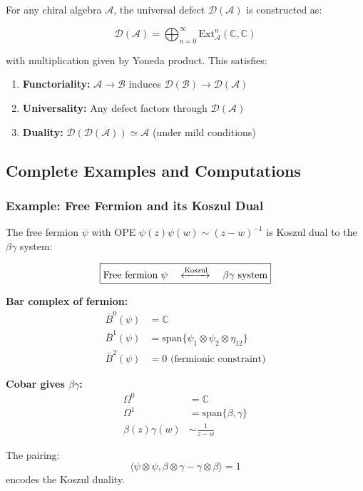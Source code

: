 \begin{theorem}\label{thm:universal-defect-construction}
For any chiral algebra $\mathcal{A}$, the universal defect $\mathcal{D}(\mathcal{A})$ is constructed as:

$$\mathcal{D}(\mathcal{A}) = \bigoplus_{n=0}^\infty \text{Ext}^n_{\mathcal{A}}(\mathbb{C}, \mathbb{C})$$

with multiplication given by Yoneda product. This satisfies:
\begin{enumerate}
\item \textbf{Functoriality:} $\mathcal{A} \to \mathcal{B}$ induces $\mathcal{D}(\mathcal{B}) \to \mathcal{D}(\mathcal{A})$
\item \textbf{Universality:} Any defect factors through $\mathcal{D}(\mathcal{A})$
\item \textbf{Duality:} $\mathcal{D}(\mathcal{D}(\mathcal{A})) \simeq \mathcal{A}$ (under mild conditions)
\end{enumerate}
\end{theorem}

\subsection{Complete Examples and Computations}

\subsubsection{Example: Free Fermion and its Koszul Dual}

\begin{example}
The free fermion $\psi$ with OPE $\psi(z)\psi(w) \sim (z-w)^{-1}$ is Koszul dual to the $\beta\gamma$ system:

$$\boxed{\text{Free fermion } \psi \quad \xleftrightarrow{\text{Koszul}} \quad \beta\gamma \text{ system}}$$

\textbf{Bar complex of fermion:}
\begin{align}
\bar{B}^0(\psi) &= \mathbb{C} \\
\bar{B}^1(\psi) &= \text{span}\{\psi_1 \otimes \psi_2 \otimes \eta_{12}\} \\
\bar{B}^2(\psi) &= 0 \text{ (fermionic constraint)}
\end{align}

\textbf{Cobar gives $\beta\gamma$:}
\begin{align}
\Omega^0 &= \mathbb{C} \\
\Omega^1 &= \text{span}\{\beta, \gamma\} \\
\beta(z)\gamma(w) &\sim \frac{1}{z-w}
\end{align}

The pairing:
$$\langle \psi \otimes \psi, \beta \otimes \gamma - \gamma \otimes \beta \rangle = 1$$
encodes the Koszul duality.
\end{example}

